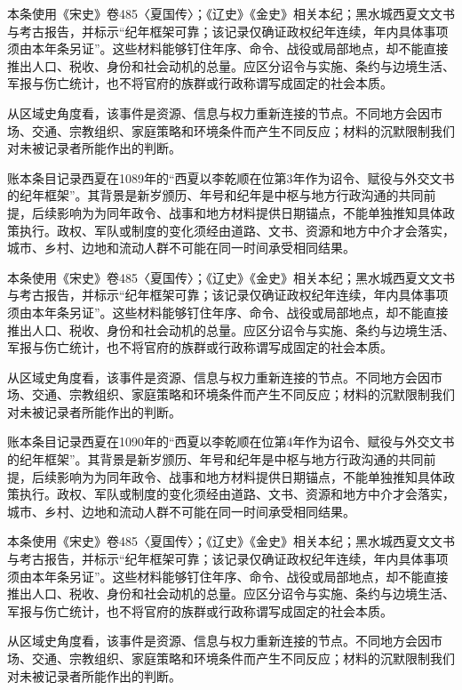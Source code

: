 本条使用《宋史》卷485〈夏国传〉；《辽史》《金史》相关本纪；黑水城西夏文文书与考古报告，并标示“纪年框架可靠；该记录仅确证政权纪年连续，年内具体事项须由本年条另证”。这些材料能够钉住年序、命令、战役或局部地点，却不能直接推出人口、税收、身份和社会动机的总量。应区分诏令与实施、条约与边境生活、军报与伤亡统计，也不将官府的族群或行政称谓写成固定的社会本质。

从区域史角度看，该事件是资源、信息与权力重新连接的节点。不同地方会因市场、交通、宗教组织、家庭策略和环境条件而产生不同反应；材料的沉默限制我们对未被记录者所能作出的判断。

账本条目记录西夏在1089年的“西夏以李乾顺在位第3年作为诏令、赋役与外交文书的纪年框架”。其背景是新岁颁历、年号和纪年是中枢与地方行政沟通的共同前提，后续影响为为同年政令、战事和地方材料提供日期锚点，不能单独推知具体政策执行。政权、军队或制度的变化须经由道路、文书、资源和地方中介才会落实，城市、乡村、边地和流动人群不可能在同一时间承受相同结果。

本条使用《宋史》卷485〈夏国传〉；《辽史》《金史》相关本纪；黑水城西夏文文书与考古报告，并标示“纪年框架可靠；该记录仅确证政权纪年连续，年内具体事项须由本年条另证”。这些材料能够钉住年序、命令、战役或局部地点，却不能直接推出人口、税收、身份和社会动机的总量。应区分诏令与实施、条约与边境生活、军报与伤亡统计，也不将官府的族群或行政称谓写成固定的社会本质。

从区域史角度看，该事件是资源、信息与权力重新连接的节点。不同地方会因市场、交通、宗教组织、家庭策略和环境条件而产生不同反应；材料的沉默限制我们对未被记录者所能作出的判断。

账本条目记录西夏在1090年的“西夏以李乾顺在位第4年作为诏令、赋役与外交文书的纪年框架”。其背景是新岁颁历、年号和纪年是中枢与地方行政沟通的共同前提，后续影响为为同年政令、战事和地方材料提供日期锚点，不能单独推知具体政策执行。政权、军队或制度的变化须经由道路、文书、资源和地方中介才会落实，城市、乡村、边地和流动人群不可能在同一时间承受相同结果。

本条使用《宋史》卷485〈夏国传〉；《辽史》《金史》相关本纪；黑水城西夏文文书与考古报告，并标示“纪年框架可靠；该记录仅确证政权纪年连续，年内具体事项须由本年条另证”。这些材料能够钉住年序、命令、战役或局部地点，却不能直接推出人口、税收、身份和社会动机的总量。应区分诏令与实施、条约与边境生活、军报与伤亡统计，也不将官府的族群或行政称谓写成固定的社会本质。

从区域史角度看，该事件是资源、信息与权力重新连接的节点。不同地方会因市场、交通、宗教组织、家庭策略和环境条件而产生不同反应；材料的沉默限制我们对未被记录者所能作出的判断。

